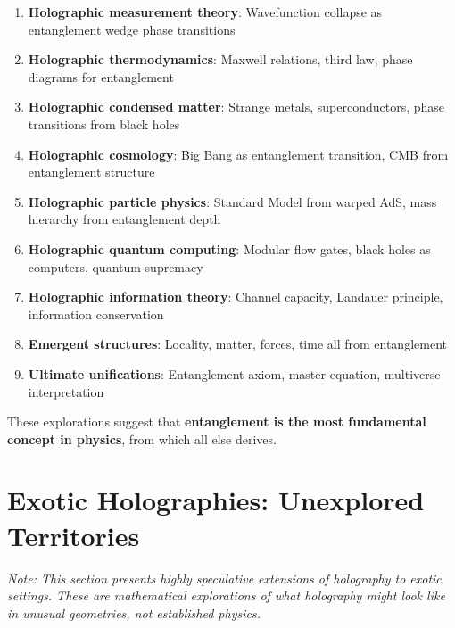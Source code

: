 \documentclass[12pt,a4paper]{article}
\begin{document}
\begin{enumerate}
    \item \textbf{Holographic measurement theory}: Wavefunction collapse as entanglement wedge phase transitions
    
    \item \textbf{Holographic thermodynamics}: Maxwell relations, third law, phase diagrams for entanglement
    
    \item \textbf{Holographic condensed matter}: Strange metals, superconductors, phase transitions from black holes
    
    \item \textbf{Holographic cosmology}: Big Bang as entanglement transition, CMB from entanglement structure
    
    \item \textbf{Holographic particle physics}: Standard Model from warped AdS, mass hierarchy from entanglement depth
    
    \item \textbf{Holographic quantum computing}: Modular flow gates, black holes as computers, quantum supremacy
    
    \item \textbf{Holographic information theory}: Channel capacity, Landauer principle, information conservation
    
    \item \textbf{Emergent structures}: Locality, matter, forces, time all from entanglement
    
    \item \textbf{Ultimate unifications}: Entanglement axiom, master equation, multiverse interpretation
\end{enumerate}

These explorations suggest that \textbf{entanglement is the most fundamental concept in physics}, from which all else derives.

\section{Exotic Holographies: Unexplored Territories}

\textit{Note: This section presents highly speculative extensions of holography to exotic settings. These are mathematical explorations of what holography might look like in unusual geometries, not established physics.}
\end{document}

